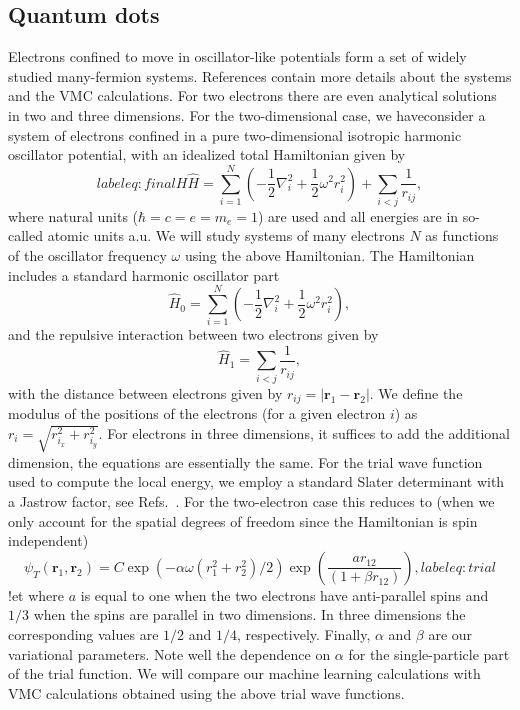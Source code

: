 \documentclass[twoside,english]{uiofysmaster}
\begin{document}
\subsection{Quantum dots}
Electrons confined to move in oscillator-like potentials form a set of
widely studied many-fermion systems.  References
\cite{Ledumthesis2018,Alociasthesis2018} contain more details about
the systems and the VMC calculations.  For two electrons there are
even analytical solutions in two and three dimensions. For the
two-dimensional case, we haveconsider a system of electrons confined
in a pure two-dimensional isotropic harmonic oscillator potential,
with an idealized total Hamiltonian given by
\begin{equation}
label{eq:finalH}
\hat{H}=\sum_{i=1}^{N} \left(  -\frac{1}{2} \nabla_i^2 + \frac{1}{2} \omega^2r_i^2  \right)+\sum_{i<j}\frac{1}{r_{ij}},
\end{equation}
where natural units ($\hbar=c=e=m_e=1$) are used and all energies are
in so-called atomic units a.u. We will study systems of many electrons
$N$ as functions of the oscillator frequency $\omega$ using the above
Hamiltonian.  The Hamiltonian includes a standard harmonic oscillator
part
\begin{equation*}
\hat{H}_0=\sum_{i=1}^{N} \left(  -\frac{1}{2} \nabla_i^2 + \frac{1}{2} \omega^2r_i^2  \right),
\end{equation*}
and the repulsive interaction between two electrons given by
\begin{equation*}
\hat{H}_1=\sum_{i<j}\frac{1}{r_{ij}},
\end{equation*}
with the distance between electrons given by $r_{ij}=\vert \bm{r}_1-\bm{r}_2\vert$. We define the 
modulus of the positions of the electrons (for a given electron $i$) as $r_i = \sqrt{r_{i_x}^2+r_{i_y}^2}$.
For electrons in three dimensions, it suffices to add the additional dimension, the equations are essentially the same. For the trial wave function used to compute the local energy, we employ a standard Slater determinant 
with a Jastrow factor, see Refs.~\cite{Ledumthesis2018,Alociasthesis2018}. For the two-electron case this reduces to (when we only account for the spatial degrees of freedom since the Hamiltonian is spin independent)
\begin{equation}
   \psi_{T}(\bm{r}_1,\bm{r}_2) = 
   C\exp{\left(-\alpha\omega(r_1^2+r_2^2)/2\right)}
   \exp{\left(\frac{ar_{12}}{(1+\beta r_{12})}\right)}, 
label{eq:trial}
\end{equation}
!et where $a$ is equal to one when the two electrons have
anti-parallel spins and $1/3$ when the spins are parallel in two dimensions. In three dimensions the corresponding values are $1/2$ and $1/4$, respectively. Finally,
$\alpha$ and $\beta$ are our variational parameters. Note well the
dependence on $\alpha$ for the single-particle part of the trial
function. We will compare our machine learning calculations with VMC calculations obtained using the above trial wave functions.
\end{document}
